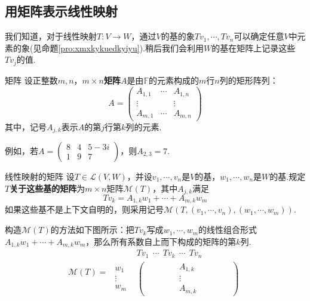 \documentclass[lang=cn, zihao=5]{elegantbook}
\newcommand{\F}{\mathbb{F}}
\newcommand{\lmap}{\mathcal{L}}
\begin{document}
\subsection{用矩阵表示线性映射}

我们知道，对于线性映射$T:V \to W$，通过$V$的基的象$Tv_1, \cdots ,Tv_n$可以确定任意$V$中元素的象(见命题\ref{pro:xmxkykuedkyiyu}).稍后我们会利用$W$的基在矩阵上记录这些$Tv_j$的值.

\begin{definition}{矩阵}
	设正整数$m,n$，$m \times n$\textbf{矩阵}$A$是由$\F$的元素构成的$m$行$n$列的矩形阵列：$$A = 
	\begin{pmatrix}
		A_{1,1} & \cdots & A_{1,n} \\
		\vdots &  & \vdots \\
		A_{m,1} & \cdots & A_{m,n}
	\end{pmatrix}$$
	其中，记号$A_{j,k}$表示$A$的第$j$行第$k$列的元素.
\end{definition}

例如，若$A=\begin{pmatrix}
	8 & 4 & 5-3i \\ 1 & 9 & 7
\end{pmatrix}$，则$A_{2,3}=7$.

\begin{definition}{线性映射的矩阵}
	设$T \in \lmap (V,W)$，并设$v_1, \cdots ,v_n$是$V$的基，$w_1, \cdots ,w_n$是$W$的基.规定$T$\textbf{关于这些基的矩阵}为$m \times n$矩阵$\mathcal{M}(T)$，其中$A_{j,k}$满足$$Tv_k = A_{1,k}w_1 + \cdots + A_{m,k}w_m$$
	如果这些基不是上下文自明的，则采用记号$\mathcal{M}(T,(v_1, \cdots ,v_n),(w_1, \cdots ,w_m))$.
\end{definition}

构造$\mathcal{M}(T)$的方法如下图所示：把$Tv_k$写成$w_1, \cdots ,w_m$的线性组合形式$A_{1,k} w_1 + \cdots + A_{m,k} w_m$，那么所有系数自上而下构成的矩阵的第$k$列.
	$$\mathcal{M}(T) = \begin{matrix}
  	& Tv_1~~ \cdots ~~Tv_k~~ \cdots ~~Tv_n\\
	\begin{matrix} w_1 \\ \vdots \\ w_m \end{matrix}  
	&\begin{pmatrix} ~~~~~ & ~~~~~ & A_{1,k} & ~~~~~ & ~~~~~\\  &  & \vdots &  & \\  &  & A_{m,k} &  & \end{pmatrix}
	\end{matrix}$$
\end{document}
